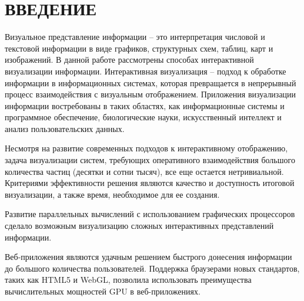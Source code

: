 \newpage
\section*{ВВЕДЕНИЕ}



Визуальное представление информации -- это интерпретация числовой и текстовой
информации в виде графиков, структурных схем, таблиц, карт и изображений.
В данной работе рассмотрены способах интерактивной визуализации информации.
Интерактивная визуализация -- подход к обработке информации в информационных 
системах, которая превращается в непрерывный процесс взаимодействия с 
визуальным отображением. Приложения визуализации информации востребованы в таких 
областях, как информационные системы и программное обеспечение, биологические 
науки, искусственный интеллект и анализ пользовательских данных.

Несмотря на развитие современных подходов к интерактивному отображению, задача
визуализации систем, требующих оперативного взаимодействия большого количества
частиц (десятки и сотни тысяч), все еще остается нетривиальной. Критериями 
эффективности решения являются качество и доступность итоговой визуализации, 
а также время, необходимое для ее создания.

Развитие параллельных вычислений с использованием графических процессоров сделало 
возможным визуализацию сложных интерактивных представлений информации. 

Веб-приложения являются удачным решением быстрого донесения информации до большого
количества пользователей. Поддержка браузерами новых стандартов, таких как HTML5 и WebGL,  
позволила использовать преимущества вычислительных мощностей GPU в веб-приложениях.

